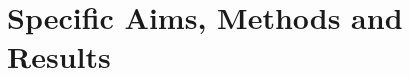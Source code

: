 \documentclass[compress]{beamer}
\begin{document}
%
%



\section{Specific Aims, Methods and Results}
\end{document}
